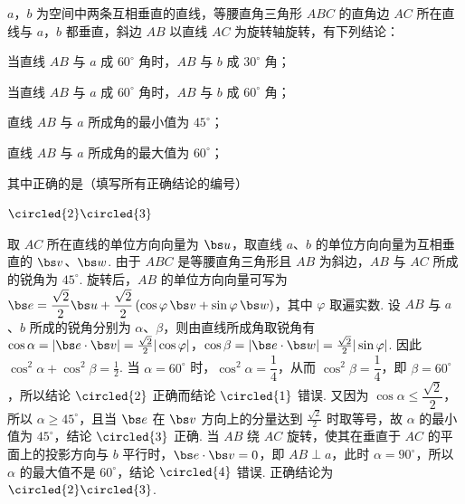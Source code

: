 \begin{problem}
\(a\)，\(b\) 为空间中两条互相垂直的直线，等腰直角三角形 \(ABC\) 的直角边 \(AC\) 所在直线与 \(a\)，\(b\) 都垂直，斜边 \(AB\) 以直线 \(AC\) 为旋转轴旋转，有下列结论：

\begin{circlelist}
\item 当直线 \(AB\) 与 \(a\) 成 \(60^\circ\) 角时，\(AB\) 与 \(b\) 成 \(30^\circ\) 角；
\item 当直线 \(AB\) 与 \(a\) 成 \(60^\circ\) 角时，\(AB\) 与 \(b\) 成 \(60^\circ\) 角；
\item 直线 \(AB\) 与 \(a\) 所成角的最小值为 \(45^\circ\)；
\item 直线 \(AB\) 与 \(a\) 所成角的最大值为 \(60^\circ\)；
\end{circlelist}

其中正确的是（填写所有正确结论的编号）\fillinblank{}
\end{problem}

\begin{answer}
\(\circled{2}\circled{3}\)
\end{answer}

\begin{solution}
取 \(AC\) 所在直线的单位方向向量为 \(\bs u\)，取直线 \(a\)、\(b\) 的单位方向向量为互相垂直的 \(\bs v\)、\(\bs w\). 由于 \(ABC\) 是等腰直角三角形且 \(AB\) 为斜边，\(AB\) 与 \(AC\) 所成的锐角为 \(45^\circ\). 旋转后，\(AB\) 的单位方向向量可写为 \(\displaystyle\bs e=\frac{\sqrt2}{2}\bs u+\frac{\sqrt2}{2}\left(\cos\varphi\,\bs v+\sin\varphi\,\bs w\right)\)，其中 \(\varphi\) 取遍实数. 设 \(AB\) 与 \(a\)、\(b\) 所成的锐角分别为 \(\alpha\)、\(\beta\)，则由直线所成角取锐角有 \(\cos\alpha=|\bs e\cdot\bs v|=\frac{\sqrt2}{2}|\cos\varphi|\)，\(\cos\beta=|\bs e\cdot\bs w|=\frac{\sqrt2}{2}|\sin\varphi|\). 因此 \(\cos^2\alpha+\cos^2\beta=\frac12\). 当 \(\alpha=60^\circ\) 时，\(\cos^2\alpha=\dfrac14\)，从而 \(\cos^2\beta=\dfrac14\)，即 \(\beta=60^\circ\)，所以结论 \(\circled{2}\) 正确而结论 \(\circled{1}\) 错误. 又因为 \(\cos\alpha\le\dfrac{\sqrt2}{2}\)，所以 \(\alpha\ge45^\circ\)，且当 \(\bs e\) 在 \(\bs v\) 方向上的分量达到 \(\frac{\sqrt2}{2}\) 时取等号，故 \(\alpha\) 的最小值为 \(45^\circ\)，结论 \(\circled{3}\) 正确. 当 \(AB\) 绕 \(AC\) 旋转，使其在垂直于 \(AC\) 的平面上的投影方向与 \(b\) 平行时，\(\bs e\cdot\bs v=0\)，即 \(AB\perp a\)，此时 \(\alpha=90^\circ\)，所以 \(\alpha\) 的最大值不是 \(60^\circ\)，结论 \(\circled{4}\) 错误. 正确结论为 \(\circled{2}\circled{3}\).
\end{solution}

